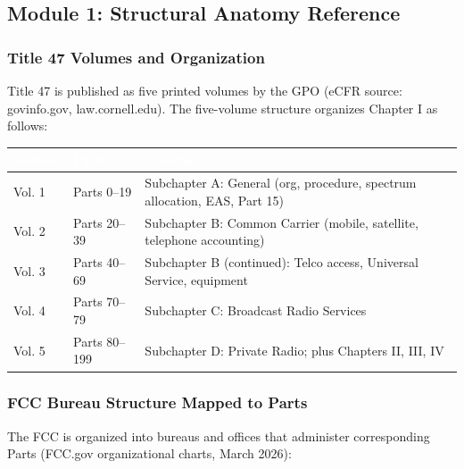 \documentclass[11pt,letterpaper]{article}
\newcommand{\tableheader}[1]{\textbf{\sffamily\textcolor{white}{#1}}}
\begin{document}
\subsection{Module 1: Structural Anatomy Reference}

\subsubsection{Title 47 Volumes and Organization}

Title 47 is published as five printed volumes by the GPO (eCFR source: govinfo.gov, law.cornell.edu). The five-volume structure organizes Chapter I as follows:

\begin{center}
\begin{tabularx}{\textwidth}{C{2.2cm}L{3cm}X}
\toprule
{}
\tableheader{Volume} & \tableheader{Parts} & \tableheader{Coverage} \\
\midrule
Vol. 1 & Parts 0--19 & Subchapter A: General (org, procedure, spectrum allocation, EAS, Part 15) \\
Vol. 2 & Parts 20--39 & Subchapter B: Common Carrier (mobile, satellite, telephone accounting) \\
Vol. 3 & Parts 40--69 & Subchapter B (continued): Telco access, Universal Service, equipment \\
Vol. 4 & Parts 70--79 & Subchapter C: Broadcast Radio Services \\
Vol. 5 & Parts 80--199 & Subchapter D: Private Radio; plus Chapters II, III, IV \\
\bottomrule
\end{tabularx}
\end{center}

\subsubsection{FCC Bureau Structure Mapped to Parts}

The FCC is organized into bureaus and offices that administer corresponding Parts (FCC.gov organizational charts, March 2026):
\end{document}
